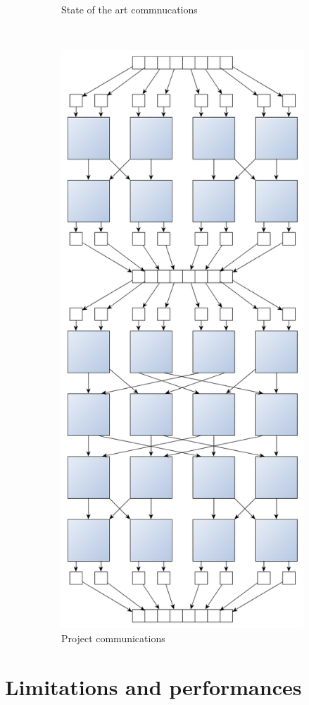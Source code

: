 \documentclass[a4paper,11pt]{article}
\begin{document}
\begin{figure}[h!]
\begin{subfigure}[b]{0.4\textwidth}
        \caption{State of the art commnucations}
        \label{fig:sato_comm}
    \end{subfigure}
    ~
    \begin{subfigure}[b]{0.4\textwidth}
        \centering
        \includegraphics[scale=0.15]{img/bitonic_sort_8.png}
        \caption{Project communications}
        \label{fig:impl_comm}
    \end{subfigure}
    \caption{}
    \label{}
  \end{figure}

\section{Limitations and performances}
\end{document}
